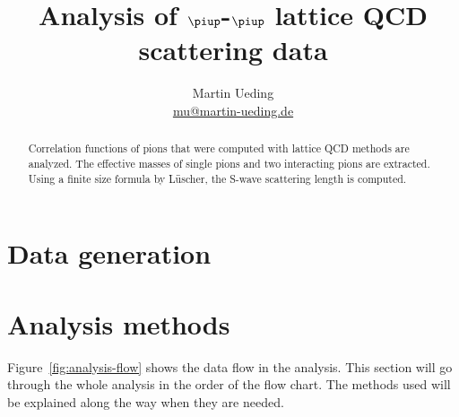 \documentclass[11pt, english, fleqn, DIV=10, headinclude]{scrartcl}
\title{Analysis of $\piup$-$\piup$ lattice QCD scattering data}
\author{
    Martin Ueding \\ \small{\href{mailto:mu@martin-ueding.de}{mu@martin-ueding.de}}
}
\begin{document}
\maketitle

\begin{abstract}
    Correlation functions of pions that were computed with lattice QCD methods
    are analyzed. The effective masses of single pions and two interacting
    pions are extracted. Using a finite size formula by Lüscher, the S-wave
    scattering length is computed.
\end{abstract}

\tableofcontents

\newpage

\section{Data generation}





\section{Analysis methods}

Figure~\ref{fig:analysis-flow} shows the data flow in the analysis. This
section will go through the whole analysis in the order of the flow chart. The
methods used will be explained along the way when they are needed.
\end{document}
